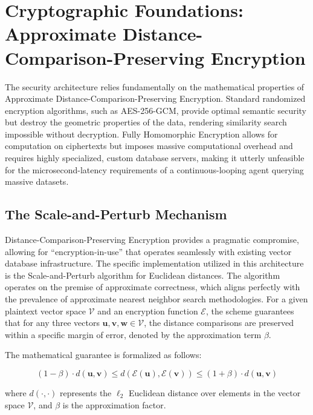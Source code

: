 \documentclass[12pt]{article}
\begin{document}
\section{Cryptographic Foundations: Approximate Distance-Comparison-Preserving Encryption}

The security architecture relies fundamentally on the mathematical properties of Approximate Distance-Comparison-Preserving Encryption. Standard randomized encryption algorithms, such as AES-256-GCM, provide optimal semantic security but destroy the geometric properties of the data, rendering similarity search impossible without decryption. Fully Homomorphic Encryption allows for computation on ciphertexts but imposes massive computational overhead and requires highly specialized, custom database servers, making it utterly unfeasible for the microsecond-latency requirements of a continuous-looping agent querying massive datasets.

\subsection{The Scale-and-Perturb Mechanism}

Distance-Comparison-Preserving Encryption provides a pragmatic compromise, allowing for ``encryption-in-use'' that operates seamlessly with existing vector database infrastructure. The specific implementation utilized in this architecture is the Scale-and-Perturb algorithm for Euclidean distances. The algorithm operates on the premise of approximate correctness, which aligns perfectly with the prevalence of approximate nearest neighbor search methodologies. For a given plaintext vector space $\mathcal{V}$ and an encryption function $\mathcal{E}$, the scheme guarantees that for any three vectors $\mathbf{u}, \mathbf{v}, \mathbf{w} \in \mathcal{V}$, the distance comparisons are preserved within a specific margin of error, denoted by the approximation term $\beta$.

The mathematical guarantee is formalized as follows:

\begin{equation}
(1 - \beta) \cdot d(\mathbf{u}, \mathbf{v}) \leq d(\mathcal{E}(\mathbf{u}), \mathcal{E}(\mathbf{v})) \leq (1 + \beta) \cdot d(\mathbf{u}, \mathbf{v})
\end{equation}

where $d(\cdot, \cdot)$ represents the $\ell_2$ Euclidean distance over elements in the vector space $\mathcal{V}$, and $\beta$ is the approximation factor.
\end{document}
